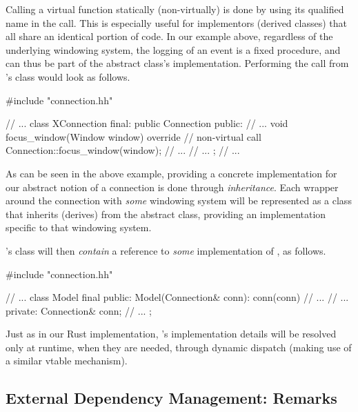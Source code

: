 Calling a virtual function statically (non-virtually) is done by using its
qualified name in the call. This is especially useful for implementors (derived
classes) that all share an identical portion of code. In our example above,
regardless of the underlying windowing system, the logging of an event is a
fixed procedure, and can thus be part of the abstract class's implementation.
Performing the call from \wmcpp's  class would look as
follows.

\begin{cppblock}
  #include "connection.hh"
\end{cppblock}
\begin{cppblock}
  // ...
  class XConnection final: public Connection
  {
  public:
    // ...
    void focus_window(Window window) override {
      // non-virtual call
      Connection::focus_window(window);
      // ...
    }
    // ...
  };
  // ...
\end{cppblock}

As can be seen in the above example, providing a concrete implementation for
our abstract notion of a connection is done through \textit{inheritance}.
Each wrapper around the connection with \textit{some} windowing system will
be represented as a class that inherits (derives) from the 
abstract class, providing an implementation specific to that windowing system.

\wmcpp's  class will then \textit{contain} a reference to
\textit{some} implementation of , as follows.

\begin{cppblock}
  #include "connection.hh"
\end{cppblock}
\begin{cppblock}
  // ...
  class Model final
  {
  public:
    Model(Connection& conn): conn(conn) {
      // ...
    }
    // ...
  private:
    Connection& conn;
    // ...
  };
\end{cppblock}

Just as in our Rust implementation, 's implementation details will
be resolved only at runtime, when they are needed, through dynamic dispatch
(making use of a similar vtable mechanism).


\subsection{External Dependency Management: Remarks}

